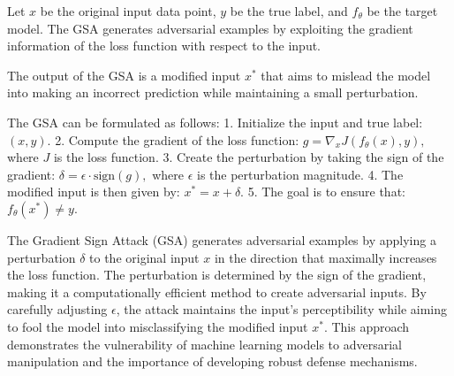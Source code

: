 Let \( x \) be the original input data point, \( y \) be the true label, and \( f_{\theta} \) be the target model. The GSA generates adversarial examples by exploiting the gradient information of the loss function with respect to the input.

The output of the GSA is a modified input \( x^* \) that aims to mislead the model into making an incorrect prediction while maintaining a small perturbation.

The GSA can be formulated as follows:
1. Initialize the input and true label:
   $
   (x, y).
   $
2. Compute the gradient of the loss function:
   $
   g = \nabla_x J(f_{\theta}(x), y),
   $
   where \( J \) is the loss function.
3. Create the perturbation by taking the sign of the gradient:
   $
   \delta = \epsilon \cdot \text{sign}(g),
   $
   where \( \epsilon \) is the perturbation magnitude.
4. The modified input is then given by:
   $
   x^* = x + \delta.
   $
5. The goal is to ensure that:
   $
   f_{\theta}(x^*) \neq y.
   $

The Gradient Sign Attack (GSA) generates adversarial examples by applying a perturbation \( \delta \) to the original input \( x \) in the direction that maximally increases the loss function. The perturbation is determined by the sign of the gradient, making it a computationally efficient method to create adversarial inputs. By carefully adjusting \( \epsilon \), the attack maintains the input's perceptibility while aiming to fool the model into misclassifying the modified input \( x^* \). This approach demonstrates the vulnerability of machine learning models to adversarial manipulation and the importance of developing robust defense mechanisms.
